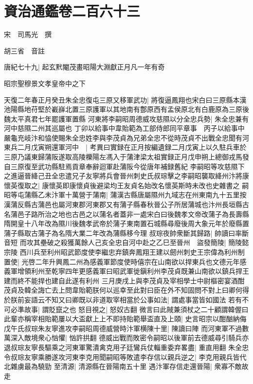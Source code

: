 \section{資治通鑑卷二百六十三}
宋　司馬光　撰

胡三省　音註

唐紀七十九|{
	起玄黓閹茂畫昭陽大淵獻正月凡一年有奇}


昭宗聖穆景文孝皇帝中之下

天復二年春正月癸丑朱全忠復屯三原又移軍武功|{
	將復逼鳳翔也宋白曰三原縣本漢池陽縣地苻堅於嶻嶭北置三原護軍以其地南有鄷原西有孟侯原北有白鹿原為三原後魏太平真君七年罷護軍置縣}
河東將李嗣昭周德威攻慈隰以分全忠兵勢|{
	朱全忠兼有河中慈隰二州其巡屬也}
丁卯以給事中韋貽範為工部侍郎同平章事　丙子以給事中嚴龜充岐汴和恊使賜朱全忠姓李與李茂貞為兄弟全忠不從時茂貞不出戰全忠聞有河東兵二月戊寅朔還軍河中　|{
	考異曰實録在正月按編遺録二月戊寅上以久駐兵車於三原乃議東歸蒲阪遂取高陵櫟陽左馮入于蒲津梁太祖實録正月戊申朔上總御戎馬發自三原復至武功縣駐焉貢章奉辭迴軍赴蒲阪今從唐年補録舊紀}
李嗣昭等攻慈隰下之進逼晉絳己丑全忠遣兄子友寧將兵會晉州刺史氏叔琮擊之李嗣昭襲取絳州汴將康懷英復取之|{
	康懷英即康懷貞後避梁均王友貞名始改名懷英斯時未改也史雜書之}
嗣昭等屯蒲縣乙未汴軍十萬營于蒲南|{
	蒲漢古縣唐屬隰州九域志在州東南九十五里按漢蒲反縣古蒲邑也屬河東郡河東郡又有蒲子縣春秋晉公子所居蒲城也汴州長垣縣古名蒲邑子路所治之地也古邑之以蒲名者蓋非一處宋白曰後魏孝文帝改蒲子為長壽縣隋開皇十八年改為隰川後魏孝武帝於蒲子東南置石城縣尋廢後周大象元年於廢縣置蒲子縣取古蒲子為名隋大業二年改為蒲縣移今理}
叔琮夜帥衆斷其歸路|{
	帥讀曰率斷音短}
而攻其壘破之殺獲萬餘人己亥全忠自河中赴之乙巳至晉州　盜發簡陵|{
	簡陵懿宗陵}
西川兵至利州昭武節度使李繼忠弃鎮奔鳳翔王建以劒州刺史王宗偉為利州制置使|{
	光啓二年升興鳳二州為感義軍節度使時僖宗在山南欲以捍東兵也文德元年感義軍增領利州至乾寧四年更感義軍曰昭武軍徙鎭利州李茂貞既兼山南欲以鎮兵捍王建而終不能捍也建自此遂有利州}
三月庚戌上與李茂貞及宰相學士中尉樞密宴酒酣茂貞及韓全誨亡去上問韋貽範朕何以巡幸至此對曰臣在外不知固問不對上曰卿何得於朕前妄語云不知又曰卿既以非道取宰相當於公事如法|{
	謂處事當皆如國法}
若有不可必準故事|{
	謂貶竄之也}
怒目視之|{
	怒奴古翻}
微言曰此賊兼須杖之二十顧謂韓偓曰此輩亦稱宰相貽範屢以大盃獻上上不即持貽範舉盃直及上頤|{
	史言昭宗以酣酗納侮}
戊午氏叔琮朱友寧進攻李嗣昭周德威營時汴軍横陳十里|{
	陳讀曰陣}
而河東軍不過數萬深入敵境衆心忷懼|{
	忷許拱翻}
德威出戰而敗密令嗣昭以後軍前去德威尋引騎兵亦退叔琮友寧長驅乘之河東軍驚潰禽克用子廷鸞兵仗輜重委弃畧盡|{
	重直用翻}
朱全忠令叔琮友寧乘勝遂攻河東李克用聞嗣昭等敗遣李存信以親兵逆之|{
	李克用親兵皆代北雜虜最為驍勁}
至清源|{
	清源縣在晉陽南五十里}
遇汴軍存信走還晉陽|{
	衆寡不敵故走}
